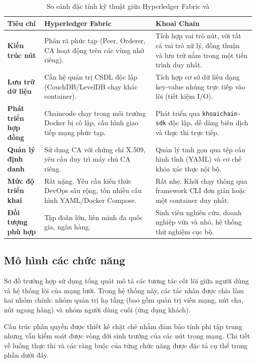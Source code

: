 \documentclass[12pt,a4paper]{article}
\begin{document}
\begin{table}[H]
    \centering
    \renewcommand{\arraystretch}{1.5}
    \begin{tabular}{|p{3.5cm}|p{5.5cm}|p{5.5cm}|}
        \hline
        \textbf{Tiêu chí} & \textbf{Hyperledger Fabric} & \textbf{Khoai Chain} \\ \hline
        \textbf{Kiến trúc nút} & Phân rã phức tạp (Peer, Orderer, CA hoạt động trên các vùng nhớ riêng). & Tích hợp vai trò nút, với tất cả vai trò xử lý, đồng thuận và lưu trữ nằm trong một tiến trình duy nhất. \\ \hline
        \textbf{Lưu trữ dữ liệu} & Cần hệ quản trị CSDL độc lập (CouchDB/LevelDB chạy khác container). & Tích hợp cơ sở dữ liệu dạng key-value nhúng trực tiếp vào lõi (tiết kiệm I/O). \\ \hline
        \textbf{Phát triển hợp đồng} & Chaincode chạy trong môi trường Docker bị cô lập, cấu hình giao tiếp mạng phức tạp. & Phát triển qua \texttt{khoaichain-sdk} độc lập, dễ dàng biên dịch và thực thi trực tiếp. \\ \hline
        \textbf{Quản lý định danh} & Sử dụng CA với chứng chỉ X.509, yêu cầu duy trì máy chủ CA riêng. & Quản lý tinh gọn qua tệp cấu hình tĩnh (YAML) và cơ chế khóa xác thực nội bộ. \\ \hline
        \textbf{Mức độ triển khai} & Rất nặng. Yêu cầu kiến thức DevOps sâu rộng, tốn nhiều cấu hình YAML/Docker Compose. & Rất nhẹ. Khởi chạy thông qua framework CLI đơn giản hoặc một container duy nhất. \\ \hline
        \textbf{Đối tượng phù hợp} & Tập đoàn lớn, liên minh đa quốc gia, ngân hàng. & Sinh viên nghiên cứu, doanh nghiệp vừa và nhỏ, hệ thống thử nghiệm cục bộ. \\ \hline
    \end{tabular}
    \caption{So sánh đặc tính kỹ thuật giữa Hyperledger Fabric và}
    \label{tab:so_sanh_fabric_khoai}
\end{table}
\newpage
\subsection{Mô hình các chức năng}

Sơ đồ trường hợp sử dụng tổng quát mô tả các tương tác cốt lõi giữa người dùng và hệ thống lõi của mạng lưới. Trong hệ thống này, các tác nhân được chia làm hai nhóm chính: nhóm quản trị hạ tầng (bao gồm quản trị viên mạng, nút cha, nút ngang hàng) và nhóm người dùng cuối (ứng dụng khách).

Cấu trúc phân quyền được thiết kế chặt chẽ nhằm đảm bảo tính phi tập trung nhưng vẫn kiểm soát được vòng đời sinh trưởng của các nút trong mạng. Chi tiết về luồng thực thi và các ràng buộc của từng chức năng được đặc tả cụ thể trong phần dưới đây.
\end{document}
